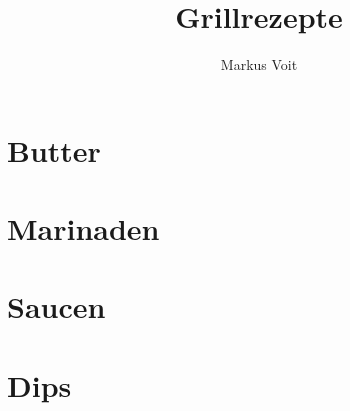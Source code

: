 \documentclass[
  DIV=11,%
  pagesize,%
  fontsize=11pt,%
  paper=a4,%
  numbers=noenddot,
]{scrartcl}
\title{Grillrezepte}
\author{Markus Voit}
\begin{document}
\maketitle

\tableofcontents
\clearpage

\section{Butter}
\newpage{}
\newpage{}
\newpage{}
\newpage{}
\newpage{}

\section{Marinaden}
\newpage{}
\newpage{}
\newpage{}

\section{Saucen}
\newpage{}
\newpage{}
\newpage{}
\newpage{}
\newpage{}
\newpage{}
\newpage{}

\section{Dips}
\newpage{}
\newpage{}
\end{document}
